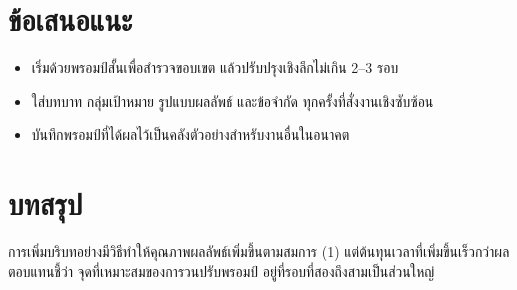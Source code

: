 \documentclass[11pt,a4paper]{article}
\begin{document}
\section{ข้อเสนอแนะ}
\begin{itemize}
  \item เริ่มด้วยพรอมป์สั้นเพื่อสำรวจขอบเขต แล้วปรับปรุงเชิงลึกไม่เกิน 2--3 รอบ
  \item ใส่บทบาท กลุ่มเป้าหมาย รูปแบบผลลัพธ์ และข้อจำกัด ทุกครั้งที่สั่งงานเชิงซับซ้อน
  \item บันทึกพรอมป์ที่ได้ผลไว้เป็นคลังตัวอย่างสำหรับงานอื่นในอนาคต
\end{itemize}

\section{บทสรุป}
การเพิ่มบริบทอย่างมีวิธีทำให้คุณภาพผลลัพธ์เพิ่มขึ้นตามสมการ (1)
แต่ต้นทุนเวลาที่เพิ่มขึ้นเร็วกว่าผลตอบแทนชี้ว่า จุดที่เหมาะสมของการวนปรับพรอมป์
อยู่ที่รอบที่สองถึงสามเป็นส่วนใหญ่
\end{document}
